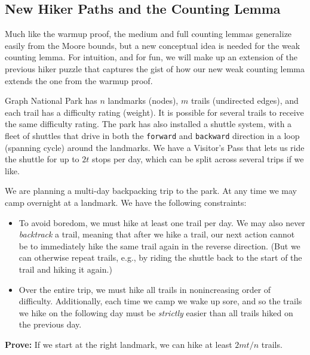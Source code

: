 \documentclass{theoretics}
\newcommand{\forward}{\texttt{forward}}
\newcommand{\backward}{\texttt{backward}}
\begin{document}
\subsection{New Hiker Paths and the Counting Lemma}

Much like the warmup proof, the medium and full counting lemmas generalize easily from the Moore bounds, but a new conceptual idea is needed for the weak counting lemma.
For intuition, and for fun, we will make up an extension of the previous hiker puzzle that captures the gist of how our new weak counting lemma extends the one from the warmup proof.

\begin{puzzle}\label{puzzle:another}
Graph National Park has $n$ landmarks (nodes), $m$ trails (undirected edges), and each trail has a difficulty rating (weight).
It is possible for several trails to receive the same difficulty rating.
The park has also installed a shuttle system, with a fleet of shuttles that drive in both the \forward{} and \backward{} direction in a loop (spanning cycle) around the landmarks.
We have a Visitor's Pass that lets us ride the shuttle for up to $2t$ stops per day, which can be split across several trips if we like.

We are planning a multi-day backpacking trip to the park.
At any time we may camp overnight at a landmark.
We have the following constraints:
\begin{itemize}
\item To avoid boredom, we must hike at least one trail per day.
We may also never \emph{backtrack} a trail, meaning that after we hike a trail, our next action cannot be to immediately hike the same trail again in the reverse direction.
(But we can otherwise repeat trails, e.g., by riding the shuttle back to the start of the trail and hiking it again.)


\item Over the entire trip, we must hike all trails in nonincreasing order of difficulty.
Additionally, each time we camp we wake up sore, and so the trails we hike on the following day must be \emph{strictly} easier than all trails hiked on the previous day.
\end{itemize}


\noindent \textbf{Prove:} If we start at the right landmark, we can hike at least $2mt/n$ trails.

\begin{center}
\begin{tikzpicture}


\end{tikzpicture}
\end{center}
\end{puzzle}
\end{document}

